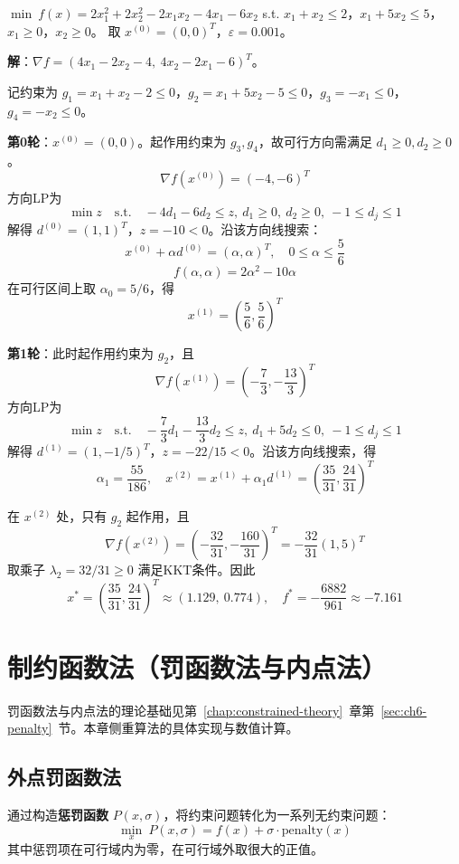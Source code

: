 \begin{example}\label{ex:fd}
$\min\ f(x) = 2x_1^2 + 2x_2^2 - 2x_1 x_2 - 4x_1 - 6x_2$
s.t. $x_1 + x_2 \leq 2$，$x_1 + 5x_2 \leq 5$，$x_1 \geq 0$，$x_2 \geq 0$。
取 $x^{(0)} = (0, 0)^T$，$\varepsilon = 0.001$。

\textbf{解}：$\nabla f = (4x_1 - 2x_2 - 4,\ 4x_2 - 2x_1 - 6)^T$。

记约束为 $g_1=x_1+x_2-2\leq0$，$g_2=x_1+5x_2-5\leq0$，$g_3=-x_1\leq0$，$g_4=-x_2\leq0$。

\textbf{第0轮}：$x^{(0)} = (0, 0)$。起作用约束为 $g_3,g_4$，故可行方向需满足 $d_1\geq0,d_2\geq0$。
\[
\nabla f(x^{(0)})=(-4,-6)^T
\]
方向LP为
\[
\min z\quad \text{s.t.}\quad -4d_1-6d_2\leq z,\ d_1\geq0,\ d_2\geq0,\ -1\leq d_j\leq1
\]
解得 $d^{(0)}=(1,1)^T$，$z=-10<0$。沿该方向线搜索：
\[
x^{(0)}+\alpha d^{(0)}=(\alpha,\alpha)^T,\quad
0\leq \alpha\leq \frac{5}{6}
\]
\[
f(\alpha,\alpha)=2\alpha^2-10\alpha
\]
在可行区间上取 $\alpha_0=5/6$，得
\[
x^{(1)}=\left(\frac{5}{6},\frac{5}{6}\right)^T
\]

\textbf{第1轮}：此时起作用约束为 $g_2$，且
\[
\nabla f(x^{(1)})=\left(-\frac{7}{3},-\frac{13}{3}\right)^T
\]
方向LP为
\[
\min z\quad \text{s.t.}\quad -\frac{7}{3}d_1-\frac{13}{3}d_2\leq z,\ d_1+5d_2\leq0,\ -1\leq d_j\leq1
\]
解得 $d^{(1)}=(1,-1/5)^T$，$z=-22/15<0$。沿该方向线搜索，得
\[
\alpha_1=\frac{55}{186},\quad
x^{(2)}=x^{(1)}+\alpha_1 d^{(1)}
=\left(\frac{35}{31},\frac{24}{31}\right)^T
\]

在 $x^{(2)}$ 处，只有 $g_2$ 起作用，且
\[
\nabla f(x^{(2)})=\left(-\frac{32}{31},-\frac{160}{31}\right)^T
=-\frac{32}{31}(1,5)^T
\]
取乘子 $\lambda_2=32/31\geq0$ 满足KKT条件。因此
\[
x^*=\left(\frac{35}{31},\frac{24}{31}\right)^T\approx(1.129,\ 0.774),\quad
f^*=-\frac{6882}{961}\approx -7.161
\]
\end{example}

\section{制约函数法（罚函数法与内点法）}\label{sec:ch7-penalty}

罚函数法与内点法的理论基础见第~\ref{chap:constrained-theory}~章第~\ref{sec:ch6-penalty}~节。本章侧重算法的具体实现与数值计算。

\subsection{外点罚函数法}

\begin{conceptbox}[外点罚函数法思想]
通过构造\textbf{惩罚函数} $P(x, \sigma)$，将约束问题转化为一系列无约束问题：
\[
\min_x\ P(x, \sigma) = f(x) + \sigma \cdot \text{penalty}(x)
\]
其中惩罚项在可行域内为零，在可行域外取很大的正值。
\end{conceptbox}

